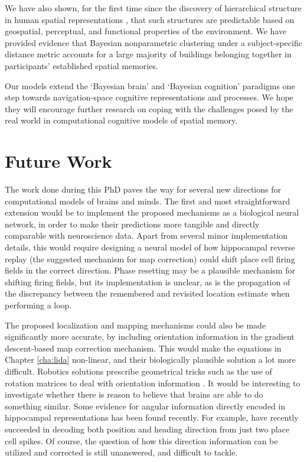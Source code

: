 We have also shown, for the first time since the discovery of hierarchical structure in human spatial representations \citep{hirtle1985evidence}, that such structures are predictable based on geospatial, perceptual, and functional properties of the environment. We have provided evidence that Bayesian nonparametric clustering under a subject-specific distance metric accounts for a large majority of buildings belonging together in participants' established spatial memories.

Our models extend the `Bayesian brain' \citep{knill2004bayesian} and `Bayesian cognition' \citep{chater2010bayesian} paradigms one step towards navigation-space cognitive representations and processes. We hope they will encourage further research on coping with the challenges posed by the real world in computational cognitive models of spatial memory.

\section{Future Work}

The work done during this PhD paves the way for several new directions for computational models of brains and minds. The first and most straightforward extension would be to implement the proposed mechanisms as a biological neural network, in order to make their predictions more tangible and directly comparable with neuroscience data. Apart from several minor implementation details, this would require designing a neural model of how hippocampal reverse replay (the suggested mechanism for map correction) could shift place cell firing fields in the correct direction. Phase resetting may be a plausible mechanism for shifting firing fields, but its implementation is unclear, as is the propagation of the discrepancy between the remembered and revisited location estimate when performing a loop. 

The proposed localization and mapping mechanisms could also be made significantly more accurate, by including orientation information in the gradient descent-based map correction mechanism. This would make the equations in Chapter \ref{cha:lida} non-linear, and their biologically plausible solution a lot more difficult. Robotics solutions prescribe geometrical tricks such as the use of rotation matrices to deal with orientation information \citep{olson2006fast}. It would be interesting to investigate whether there is reason to believe that brains are able to do something similar. Some evidence for angular information directly encoded in hippocampal representations has been found recently. For example, \cite{huxter2008theta} have recently succeeded in decoding both position and heading direction from just two place cell spikes. Of course, the question of how this direction information can be utilized and corrected is still unanswered, and difficult to tackle.

